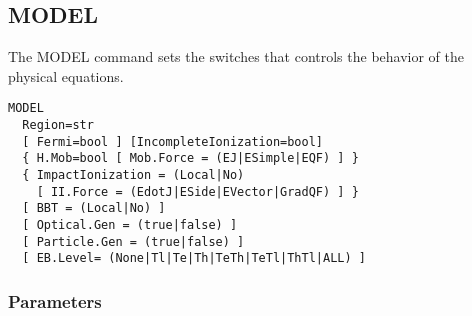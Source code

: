 \documentclass[oneside,12pt]{cgd_book}
\begin{document}
\subsection{MODEL}
The MODEL command sets the switches that controls the behavior of the physical equations.
\par
\begin{lstlisting}[style=GeniusCmd]
MODEL
  Region=str
  [ Fermi=bool ] [IncompleteIonization=bool]
  { H.Mob=bool [ Mob.Force = (EJ|ESimple|EQF) ] }
  { ImpactIonization = (Local|No)
    [ II.Force = (EdotJ|ESide|EVector|GradQF) ] }
  [ BBT = (Local|No) ]
  [ Optical.Gen = (true|false) ]
  [ Particle.Gen = (true|false) ]
  [ EB.Level= (None|Tl|Te|Th|TeTh|TeTl|ThTl|ALL) ]
\end{lstlisting}
\subsubsection{Parameters}
\end{document}
